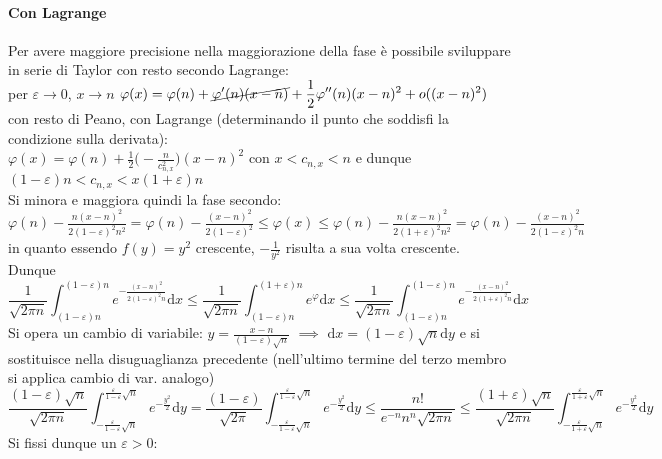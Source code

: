 \documentclass[10pt]{article}
\theoremstyle{plain}
\begin{document}
\paragraph*{Con Lagrange} Per avere maggiore precisione nella maggiorazione della fase è possibile sviluppare in serie di Taylor con resto secondo Lagrange:
\\per $\varepsilon \rightarrow 0$, $x \rightarrow n$ $\displaystyle \varphi(x) = \varphi(n) + \cancel{\varphi'(n) (x - n)} + \frac{1}{2}\varphi''(n) (x-n)^2 + o((x-n)^2)$ con resto di Peano, con Lagrange (determinando il punto che soddisfi la condizione sulla derivata):
\\$\displaystyle\varphi(x) = \varphi(n) + \frac{1}{2}\big(-\frac{n}{c_{n, x}^2}\big)(x-n)^2$ con $x < c_{n,x} < n$ e dunque $(1-\varepsilon)n < c_{n,x} < x (1+\varepsilon) n$
\\Si minora e maggiora quindi la fase secondo: $\displaystyle \varphi(n) - \frac{n(x - n)^2}{2(1-\varepsilon)^2 n^2} = \varphi(n) - \frac{(x - n)^2}{2(1-\varepsilon)^2} \leq \varphi(x) \leq \varphi(n) - \frac{n(x - n)^2}{2(1+\varepsilon)^2 n^2} = \varphi(n) - \frac{(x - n)^2}{2(1-\varepsilon)^2 n}$ in quanto essendo $f(y) = y^2$ crescente, $- \frac{1}{y^2}$ risulta a sua volta crescente.
\\Dunque
\[\frac{1}{\sqrt{2\pi n}}\int_{(1-\varepsilon)n}^{(1-\varepsilon)n} e^{\displaystyle - \frac{(x-n)^2}{2(1-\varepsilon)^2 n}} \textrm{d}x \leq \frac{1}{\sqrt{2\pi n}}\int_{(1-\varepsilon) n}^{(1+\varepsilon)n} e^{\varphi} \textrm{d}x \leq \frac{1}{\sqrt{2\pi n}}\int_{(1-\varepsilon)n}^{(1-\varepsilon)n} e^{\displaystyle - \frac{(x-n)^2}{2(1+\varepsilon)^2 n}} \textrm{d}x\]
Si opera un cambio di variabile: $\displaystyle y = \frac{x-n}{(1-\varepsilon)\sqrt{n}}$ $\implies$ $\textrm{d}x = (1-\varepsilon)\sqrt{n} \textrm{d}y$ e si sostituisce nella disuguaglianza precedente (nell'ultimo termine del terzo membro si applica cambio di var. analogo)
\[\frac{(1-\varepsilon) \sqrt{n}}{\sqrt{2\pi n}}\int_{- \frac{\varepsilon}{1-\varepsilon}\sqrt{n}}^{\frac{\varepsilon}{1-\varepsilon}\sqrt{n}} e^{\displaystyle - \frac{y^2}{2}} \textrm{d}y = \frac{(1-\varepsilon)}{\sqrt{2\pi}}\int_{ - \frac{\varepsilon}{1-\varepsilon}\sqrt{n}}^{\frac{\varepsilon}{1-\varepsilon}\sqrt{n}} e^{\displaystyle - \frac{y^2}{2}} \textrm{d}y\leq \frac{n!}{e^{-n} n^n \sqrt{2\pi n}} \leq \frac{(1+\varepsilon) \sqrt{n}}{\sqrt{2\pi n}}\int_{- \frac{\varepsilon}{1+\varepsilon}\sqrt{n}}^{\frac{\varepsilon}{1+\varepsilon}\sqrt{n}} e^{\displaystyle - \frac{y^2}{2}} \textrm{d}y\]
Si fissi dunque un $\varepsilon > 0$:
\end{document}
